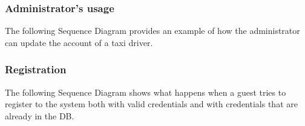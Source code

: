 \documentclass{article}
\begin{document}
	\subsubsection{Administrator's usage}
	The following Sequence Diagram provides an example of how the administrator can update the account of a taxi driver.
	\begin{figure}[H]
	\end{figure}
	\clearpage
	\subsubsection{Registration}
	The following Sequence Diagram shows what happens when a guest tries to register to the system both with valid credentials and with credentials that are already in the DB\@.
	\begin{figure}[H]
	\end{figure}
	\clearpage
\end{document}
